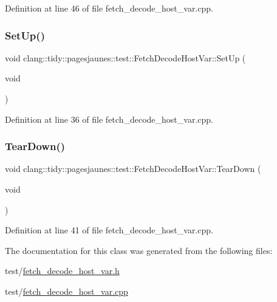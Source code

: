 Definition at line 46 of file fetch\+\_\+decode\+\_\+host\+\_\+var.\+cpp.

\mbox{\label{classclang_1_1tidy_1_1pagesjaunes_1_1test_1_1_fetch_decode_host_var_a879a617ca5c4546b2f63b4fe0986f73a}} 
\subsubsection{\texorpdfstring{Set\+Up()}{SetUp()}}
{\footnotesize\ttfamily void clang\+::tidy\+::pagesjaunes\+::test\+::\+Fetch\+Decode\+Host\+Var\+::\+Set\+Up (\begin{DoxyParamCaption}\item[{void}]{ }\end{DoxyParamCaption})\hspace{0.3cm}{\ttfamily [virtual]}}



Definition at line 36 of file fetch\+\_\+decode\+\_\+host\+\_\+var.\+cpp.

\mbox{\label{classclang_1_1tidy_1_1pagesjaunes_1_1test_1_1_fetch_decode_host_var_a47f20a0ef0fe3b100ee05ddca4ef911a}} 
\subsubsection{\texorpdfstring{Tear\+Down()}{TearDown()}}
{\footnotesize\ttfamily void clang\+::tidy\+::pagesjaunes\+::test\+::\+Fetch\+Decode\+Host\+Var\+::\+Tear\+Down (\begin{DoxyParamCaption}\item[{void}]{ }\end{DoxyParamCaption})\hspace{0.3cm}{\ttfamily [virtual]}}



Definition at line 41 of file fetch\+\_\+decode\+\_\+host\+\_\+var.\+cpp.



The documentation for this class was generated from the following files\+:\begin{DoxyCompactItemize}
\item 
test/\hyperlink{fetch__decode__host__var_8h}{fetch\+\_\+decode\+\_\+host\+\_\+var.\+h}\item 
test/\hyperlink{fetch__decode__host__var_8cpp}{fetch\+\_\+decode\+\_\+host\+\_\+var.\+cpp}\end{DoxyCompactItemize}
